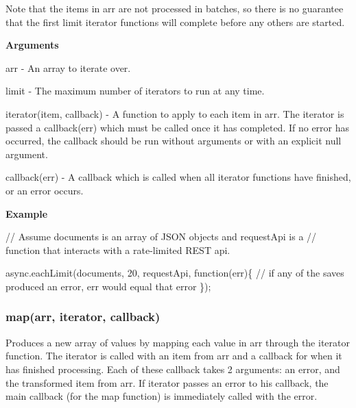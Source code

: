 Note that the items in {\ttfamily arr} are not processed in batches, so there is no guarantee that the first {\ttfamily limit} {\ttfamily iterator} functions will complete before any others are started.

{\bfseries Arguments}


\begin{DoxyItemize}
\item {\ttfamily arr} -\/ An array to iterate over.
\item {\ttfamily limit} -\/ The maximum number of {\ttfamily iterator}s to run at any time.
\item {\ttfamily iterator(item, callback)} -\/ A function to apply to each item in {\ttfamily arr}. The iterator is passed a {\ttfamily callback(err)} which must be called once it has completed. If no error has occurred, the callback should be run without arguments or with an explicit {\ttfamily null} argument.
\item {\ttfamily callback(err)} -\/ A callback which is called when all {\ttfamily iterator} functions have finished, or an error occurs.
\end{DoxyItemize}

{\bfseries Example}


\begin{DoxyCode}
\textcolor{comment}{// Assume documents is an array of JSON objects and requestApi is a}
\textcolor{comment}{// function that interacts with a rate-limited REST api.}

async.eachLimit(documents, 20, requestApi, \textcolor{keyword}{function}(err)\{
    \textcolor{comment}{// if any of the saves produced an error, err would equal that error}
\});
\end{DoxyCode}
 



\label{_map}%
 \subsubsection*{map(arr, iterator, callback)}

Produces a new array of values by mapping each value in {\ttfamily arr} through the {\ttfamily iterator} function. The {\ttfamily iterator} is called with an item from {\ttfamily arr} and a callback for when it has finished processing. Each of these callback takes 2 arguments\+: an {\ttfamily error}, and the transformed item from {\ttfamily arr}. If {\ttfamily iterator} passes an error to his callback, the main {\ttfamily callback} (for the {\ttfamily map} function) is immediately called with the error.

